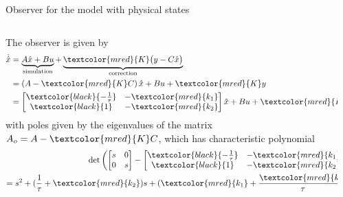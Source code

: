 \documentclass[presentation,aspectratio=169]{beamer}
\begin{document}
\begin{frame}[label={sec:org3f6e467}]{Observer for the model with physical states}
\small

\begin{columns}
\begin{column}{0.4\columnwidth}
The observer is given by
     \begin{equation*}
     \begin{split}
     \dot{\hat{x}} &= \underbrace{A \hat{x} + B u{}}_{\text{simulation}} + \underbrace{\textcolor{mred}{K}\big(y - C\hat{x}\big)}_{\text{correction}}\\
&= \left(A - \textcolor{mred}{K}C\right)\hat{x} +  B u{} + \textcolor{mred}{K}y\\
         &= \begin{bmatrix} \textcolor{black}{-\frac{1}{\tau}} & -\textcolor{mred}{k_1}  \\\textcolor{black}{1} & -\textcolor{mred}{k_2}  \end{bmatrix}\hat{x} +  B u{} + \textcolor{mred}{K}y
     \end{split}
     \end{equation*}
with poles given by the eigenvalues of the matrix \(A_o = A - \textcolor{mred}{K}C\),
which has characteristic polynomial
 \begin{equation*}
     \begin{split}
      \det \left( \begin{bmatrix} s & 0\\ 0 & s\end{bmatrix} - \begin{bmatrix} \textcolor{black}{-\frac{1}{\tau}} & - \textcolor{mred}{k_1}  \\\textcolor{black}{1} & -\textcolor{mred}{k_2}\end{bmatrix}\right)\\
= s^2 + (\frac{1}{\tau} + \textcolor{mred}{k_2})s +  (\textcolor{mred}{k_1}+\frac{\textcolor{mred}{k_2}}{\tau})
     \end{split}
     \end{equation*}
\end{column}




\begin{column}{0.4\columnwidth}
\pause

\begin{center}
\end{center}
\end{column}
\end{columns}
\end{frame}
\end{document}
